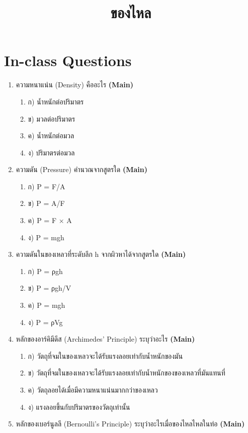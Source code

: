 \documentclass[12pt]{article}
\begin{document}
\title{ของไหล}
\maketitle
\section*{In-class Questions}
\begin{enumerate}[label=\arabic*.]
\item ความหนาแน่น (Density) คืออะไร \hfill \textbf{\small (Main)}
\begin{enumerate}[label=)]
\item ก) น้ำหนักต่อปริมาตร
\item ข) มวลต่อปริมาตร
\item ค) น้ำหนักต่อมวล
\item ง) ปริมาตรต่อมวล
\end{enumerate}
\item ความดัน (Pressure) คำนวณจากสูตรใด \hfill \textbf{\small (Main)}
\begin{enumerate}[label=)]
\item ก) P = F/A
\item ข) P = A/F
\item ค) P = F × A
\item ง) P = mgh
\end{enumerate}
\item ความดันในของเหลวที่ระดับลึก h จากผิวหาได้จากสูตรใด \hfill \textbf{\small (Main)}
\begin{enumerate}[label=)]
\item ก) P = ρgh
\item ข) P = ρgh/V
\item ค) P = mgh
\item ง) P = ρVg
\end{enumerate}
\item หลักของอาร์คิมีดีส (Archimedes' Principle) ระบุว่าอะไร \hfill \textbf{\small (Main)}
\begin{enumerate}[label=)]
\item ก) วัตถุที่จมในของเหลวจะได้รับแรงลอยเท่ากับน้ำหนักของมัน
\item ข) วัตถุที่จมในของเหลวจะได้รับแรงลอยเท่ากับน้ำหนักของของเหลวที่มันแทนที่
\item ค) วัตถุลอยได้เมื่อมีความหนาแน่นมากกว่าของเหลว
\item ง) แรงลอยขึ้นกับปริมาตรของวัตถุเท่านั้น
\end{enumerate}
\item หลักของเบอร์นูลลี (Bernoulli's Principle) ระบุว่าอะไรเมื่อของไหลไหลในท่อ \hfill \textbf{\small (Main)}

\end{enumerate}
\end{document}
